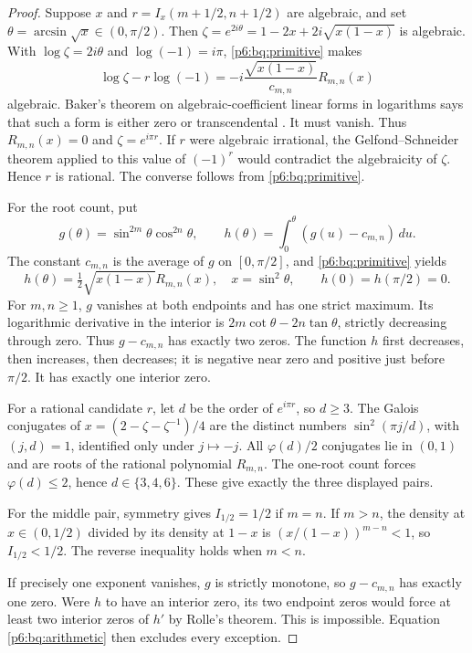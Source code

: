 \documentclass[11pt,a4paper]{article}
\theoremstyle{definition}
\theoremstyle{remark}
\numberwithin{equation}{section}
\begin{document}
\begin{proof}
Suppose $x$ and $r=I_x(m+1/2,n+1/2)$ are algebraic, and set
$\theta=\arcsin\sqrt{x}\in(0,\pi/2)$.
Then $\zeta=e^{2i\theta}=1-2x+2i\sqrt{x(1-x)}$ is algebraic.
With $\log\zeta=2i\theta$ and $\log(-1)=i\pi$,
\eqref{p6:bq:primitive} makes
\[
 \log\zeta-r\log(-1)
    =-i\frac{\sqrt{x(1-x)}}{c_{m,n}}R_{m,n}(x)
\]
algebraic. Baker's theorem on algebraic-coefficient linear forms
in logarithms says that such a form is either zero or
transcendental \cite{p5:aq:BakerIII}. It must vanish. Thus
$R_{m,n}(x)=0$ and $\zeta=e^{i\pi r}$. If $r$ were algebraic
irrational, the Gelfond--Schneider theorem applied to this value
of $(-1)^r$ would contradict the algebraicity of $\zeta$.
Hence $r$ is rational. The converse follows from
\eqref{p6:bq:primitive}.

For the root count, put
\[
 g(\theta)=\sin^{2m}\theta\cos^{2n}\theta,
 \qquad h(\theta)=\int_0^\theta(g(u)-c_{m,n})\,du.
\]
The constant $c_{m,n}$ is the average of $g$ on $[0,\pi/2]$,
and \eqref{p6:bq:primitive} yields
\begin{equation}\label{p6:bq:h}
 h(\theta)=\tfrac12\sqrt{x(1-x)}R_{m,n}(x),
 \quad x=\sin^2\theta,\qquad h(0)=h(\pi/2)=0.
\end{equation}
For $m,n\ge1$, $g$ vanishes at both endpoints and has one
strict maximum. Its logarithmic derivative in the interior is
$2m\cot\theta-2n\tan\theta$, strictly decreasing through zero.
Thus $g-c_{m,n}$ has exactly two zeros. The function $h$ first
decreases, then increases, then decreases; it is negative near
zero and positive just before $\pi/2$. It has exactly one
interior zero.

For a rational candidate $r$, let $d$ be the order of
$e^{i\pi r}$, so $d\ge3$. The Galois conjugates of
$x=(2-\zeta-\zeta^{-1})/4$ are the distinct numbers
$\sin^2(\pi j/d)$, with $(j,d)=1$, identified only under
$j\mapsto-j$. All $\varphi(d)/2$ conjugates lie in $(0,1)$
and are roots of the rational polynomial $R_{m,n}$.
The one-root count forces $\varphi(d)\le2$, hence
$d\in\{3,4,6\}$. These give exactly the three displayed pairs.

For the middle pair, symmetry gives $I_{1/2}=1/2$ if $m=n$.
If $m>n$, the density at $x\in(0,1/2)$ divided by its density
at $1-x$ is $(x/(1-x))^{m-n}<1$, so $I_{1/2}<1/2$.
The reverse inequality holds when $m<n$.

If precisely one exponent vanishes, $g$ is strictly monotone,
so $g-c_{m,n}$ has exactly one zero. Were $h$ to have an
interior zero, its two endpoint zeros would force at least two
interior zeros of $h'$ by Rolle's theorem. This is impossible.
Equation \eqref{p6:bq:arithmetic} then excludes every exception.
\end{proof}
\end{document}
